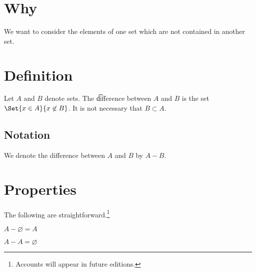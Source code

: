 

\section*{Why}

We want to consider the elements of one set which are not contained in another set.

\section*{Definition}

Let $A$ and $B$ denote sets.
The \t{difference} between $A$ and $B$ is the set $\Set{x \in A}{x \not\in B}$.
It is not necessary that $B \subset A$.

\subsection*{Notation}

We denote the difference between $A$ and $B$ by $A - B$.

\section*{Properties}

The following are straightforward.\footnote{Accounts will appear in future editions.}

\begin{proposition}
$A - \varnothing = A$\end{proposition}
\begin{proposition}
$A - A = \varnothing$\end{proposition}
\blankpage